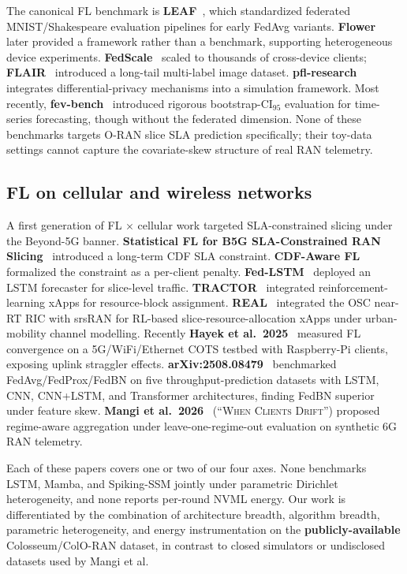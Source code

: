 \documentclass[journal]{IEEEtran}
\begin{document}
The canonical FL benchmark is \textbf{LEAF}~\cite{Caldas2018_LEAF}, which standardized federated MNIST/Shakespeare evaluation pipelines for early FedAvg variants. \textbf{Flower}~\cite{Beutel2020_Flower} later provided a framework rather than a benchmark, supporting heterogeneous device experiments. \textbf{FedScale}~\cite{Lai2022_FedScale} scaled to thousands of cross-device clients; \textbf{FLAIR}~\cite{Song2022_FLAIR} introduced a long-tail multi-label image dataset. \textbf{pfl-research}~\cite{Granqvist2024_pflresearch} integrates differential-privacy mechanisms into a simulation framework. Most recently, \textbf{fev-bench}~\cite{Shchur2025_fevbench} introduced rigorous bootstrap-CI$_{95}$ evaluation for time-series forecasting, though without the federated dimension. None of these benchmarks targets O-RAN slice SLA prediction specifically; their toy-data settings cannot capture the covariate-skew structure of real RAN telemetry.

\subsection{FL on cellular and wireless networks}

A first generation of FL $\times$ cellular work targeted SLA-constrained slicing under the Beyond-5G banner. \textbf{Statistical FL for B5G SLA-Constrained RAN Slicing}~\cite{Statistical2021_B5G} introduced a long-term CDF SLA constraint. \textbf{CDF-Aware FL}~\cite{CDFaware2021} formalized the constraint as a per-client penalty. \textbf{Fed-LSTM}~\cite{FedLSTM2022} deployed an LSTM forecaster for slice-level traffic. \textbf{TRACTOR}~\cite{Groen2023_TRACTOR} integrated reinforcement-learning xApps for resource-block assignment. \textbf{REAL}~\cite{Barker2025_REAL} integrated the OSC near-RT RIC with srsRAN for RL-based slice-resource-allocation xApps under urban-mobility channel modelling. Recently \textbf{Hayek et al.\ 2025}~\cite{Hayek2025} measured FL convergence on a 5G/WiFi/Ethernet COTS testbed with Raspberry-Pi clients, exposing uplink straggler effects. \textbf{arXiv:2508.08479}~\cite{arXiv2508_08479} benchmarked FedAvg/FedProx/FedBN on five throughput-prediction datasets with LSTM, CNN, CNN+LSTM, and Transformer architectures, finding FedBN superior under feature skew. \textbf{Mangi et al.\ 2026}~\cite{Mangi2026} (``\textsc{When Clients Drift}'') proposed regime-aware aggregation under leave-one-regime-out evaluation on synthetic 6G RAN telemetry.

Each of these papers covers one or two of our four axes. None benchmarks LSTM, Mamba, and Spiking-SSM jointly under parametric Dirichlet heterogeneity, and none reports per-round NVML energy. Our work is differentiated by the combination of architecture breadth, algorithm breadth, parametric heterogeneity, and energy instrumentation on the \textbf{publicly-available} Colosseum/ColO-RAN dataset, in contrast to closed simulators or undisclosed datasets used by Mangi et al.
\end{document}
